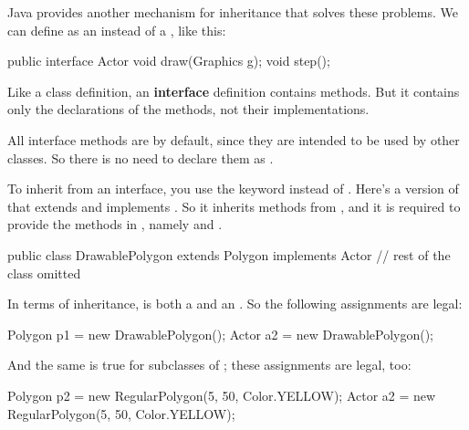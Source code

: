
Java provides another mechanism for inheritance that solves these problems.
We can define  as an  instead of a , like this:

\begin{code}
public interface Actor {
    void draw(Graphics g);
    void step();
}
\end{code}


Like a class definition, an {\bf interface} definition contains methods.
But it contains only the declarations of the methods, not their implementations.


All interface methods are  by default, since they are intended to be used by other classes.
So there is no need to declare them as .

To inherit from an interface, you use the keyword  instead of .
Here's a version of  that extends  and implements .
So it inherits methods from , and it is required to provide the methods in , namely  and .

\begin{code}
public class DrawablePolygon extends Polygon implements Actor {
    // rest of the class omitted
}
\end{code}

In terms of inheritance,  is both a  and an .
So the following assignments are legal:

\begin{code}
Polygon p1 = new DrawablePolygon();
Actor a2 = new DrawablePolygon();
\end{code}

And the same is true for subclasses of ; these assignments are legal, too:

\begin{code}
Polygon p2 = new RegularPolygon(5, 50, Color.YELLOW);
Actor a2 = new RegularPolygon(5, 50, Color.YELLOW);
\end{code}


